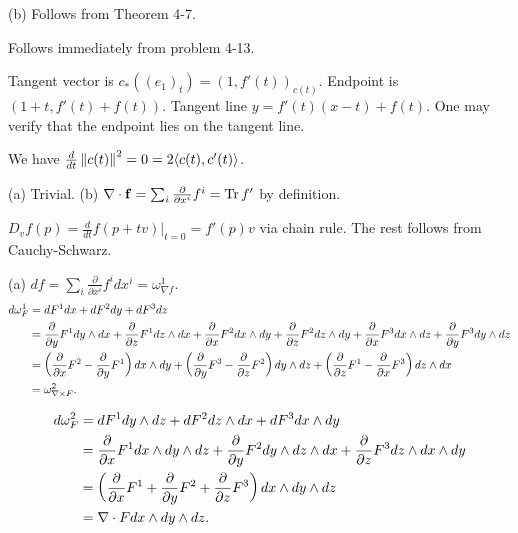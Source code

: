 \documentclass[11pt]{scrartcl}
\begin{document}
(b) Follows from Theorem 4-7.

\begin{problem*}[4-14]
\end{problem*}
Follows immediately from problem 4-13.

\begin{problem*}[4-15]
\end{problem*}
Tangent vector is $c_*((e_1)_t) = (1, f'(t))_{c(t)}$.
Endpoint is $(1 + t, f'(t) + f(t))$.
Tangent line $y = f'(t)(x - t) + f(t)$.
One may verify that the endpoint lies on the tangent line.

\begin{problem*}[4-16]
\end{problem*}
We have $\frac{d}{dt}\left\lVert c(t) \right\rVert^2 = 0 = 2\langle c(t), c'(t) \rangle$.

\begin{problem*}[4-17]
\end{problem*}
(a) Trivial.
(b) $\nabla\cdot \mathbf{f} = \sum_i\frac{\partial}{\partial x^i}f^i = \operatorname{Tr}{f'}$ by definition.

\begin{problem*}[4-18]
\end{problem*}
$D_vf(p) = \frac{d}{dt}f(p + tv)|_{t = 0} = f'(p)v$ via chain rule.
The rest follows from Cauchy-Schwarz.

\begin{problem*}[4-19]
\end{problem*}
(a)
$df = \sum_i\frac{\partial}{\partial x^i}f^idx^i = \omega^1_{\nabla f}$.
\begin{align*}
    d\omega^1_F 
    &=
    dF^1 dx + dF^2 dy + dF^3 dz \\
    &=
    \frac{\partial}{\partial y}F^1 dy\wedge dx + \frac{\partial}{\partial z}F^1 dz\wedge dx + \frac{\partial}{\partial x}F^2 dx\wedge dy + \frac{\partial}{\partial z}F^2 dz\wedge dy + \frac{\partial}{\partial x}F^3 dx\wedge dz + \frac{\partial}{\partial y}F^3 dy\wedge dz \\
    &=
    \left(\frac{\partial}{\partial x}F^2 - \frac{\partial}{\partial y}F^1\right)dx\wedge dy + \left(\frac{\partial}{\partial y}F^3 - \frac{\partial}{\partial z}F^2\right)dy\wedge dz + \left(\frac{\partial}{\partial z}F^1 - \frac{\partial}{\partial x}F^3\right)dz\wedge dx \\
    &=
    \omega^2_{\nabla \times F}.
\end{align*}

\begin{align*}
    d\omega^2_F 
    &= 
    dF^1 dy\wedge dz + dF^2 dz\wedge dx + dF^3 dx\wedge dy \\
    &=
    \frac{\partial}{\partial x}F^1 dx\wedge dy\wedge dz + \frac{\partial}{\partial y}F^2 dy\wedge dz\wedge dx + \frac{\partial}{\partial z}F^3 dz\wedge dx\wedge dy \\
    &=
    \left(\frac{\partial}{\partial x}F^1 + \frac{\partial}{\partial y}F^2 + \frac{\partial}{\partial z}F^3\right)dx\wedge dy\wedge dz \\
    &=
    \nabla\cdot F dx\wedge dy\wedge dz.
\end{align*}
\end{document}

